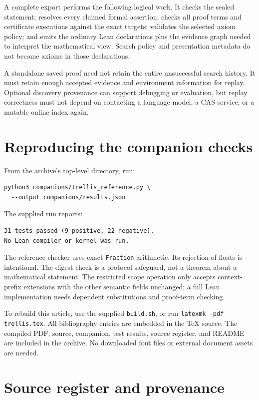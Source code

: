 \documentclass[11pt,a4paper]{article}
\theoremstyle{definition}
\theoremstyle{remark}
\newcommand{\code}[1]{\texttt{#1}}
\begin{document}
A complete export performs the following logical work. It checks the sealed statement; resolves every claimed formal assertion; checks all proof terms and certificate executions against the exact targets; validates the selected axiom policy; and emits the ordinary Lean declarations plus the evidence graph needed to interpret the mathematical view. Search policy and presentation metadata do not become axioms in those declarations.

A standalone saved proof need not retain the entire unsuccessful search history. It must retain enough accepted evidence and environment information for replay. Optional discovery provenance can support debugging or evaluation, but replay correctness must not depend on contacting a language model, a CAS service, or a mutable online index again.

\section{Reproducing the companion checks}
\label{app:repro}

From the archive's top-level directory, run:
\begin{lstlisting}
python3 companions/trellis_reference.py \
  --output companions/results.json
\end{lstlisting}
The supplied run reports:
\begin{lstlisting}
31 tests passed (9 positive, 22 negative).
No Lean compiler or kernel was run.
\end{lstlisting}
The reference checker uses exact \code{Fraction} arithmetic. Its rejection of floats is intentional. The digest check is a protocol safeguard, not a theorem about a mathematical statement. The restricted scope operation only accepts context-prefix extensions with the other semantic fields unchanged; a full Lean implementation needs dependent substitutions and proof-term checking.

To rebuild this article, use the supplied \code{build.sh}, or run \code{latexmk -pdf trellis.tex}. All bibliography entries are embedded in the TeX source. The compiled PDF, source, companion, test results, source register, and README are included in the archive. No downloaded font files or external document assets are needed.

\section{Source register and provenance}
\label{app:register}
\end{document}
